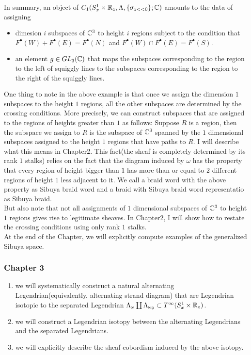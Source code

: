 In summary, an object of $C_1(S^1_x\times \mathbb{R}_z,\Lambda,\{\sigma_{z<<0}\};\mathbb{C})$ amounts to the data of assigning 
\begin{itemize}
\item  dimesion $i$ subspaces of $\mathbb{C}^3$ to height $i$ regions subject to the condition that $F^\bullet(W)+F^\bullet(E) = F^\bullet(N)$ and $F^\bullet(W)\cap F^\bullet(E) = F^\bullet(S)$.

\item an element $g \in GL_3(\mathbb{C})$ that maps the subspaces corresponding to the region to the left of squiggly lines to the subspaces corresponding to the region to the right of the squiggly lines.
\end{itemize}
One thing to note in the above example is that once we assign the dimension $1$ subspaces to the height $1$ regions, all the other subspaces are determined by the crossing conditions. More precisely, we can construct subspaces that are assigned to the regions of heights greater than $1$ as follows: Suppose $R$ is a region, then the subspace we assign to $R$ is the subspace of $\mathbb{C}^3$ spanned by the $1$ dimensional subspaces assigned to the height $1$ regions that have paths to $R$. I will describe what this means in Chapter2. This fact(the sheaf is completely determined by its rank $1$ stalks) relies on the fact that the diagram induced by $\omega$ has the property that every region of height bigger than $1$ has more than or equal to $2$ different regions of height $1$ less adjacent to it. We call a braid word with the above property as Sibuya braid word and a braid with Sibuya braid word representatio as Sibuya braid.\\
But also note that not all assignments of $1$ dimensional subspaces of $\mathbb{C}^3$ to height $1$ regions gives rise to legitimate sheaves. In Chapter2, I will show how to restate the crossing conditions using only rank $1$ stalks.\\
At the end of the Chapter, we will explicitly compute examples of the generalized Sibuya space.
\subsubsection*{Chapter 3}
\begin{enumerate}[label = (\roman*)]
\item we will systematically construct a natural alternating Legendrian(equivalently, alternating strand diagram) that are Legendrian isotopic to the separated Legendrian $\Lambda_\omega \coprod \Lambda_{\omega_\emptyset} \subset T^\infty(S^1_x \times \mathbb{R}_z)$.

\item we will construct a Legendrian isotopy between the alternating Legendrians and the separated Legendrians.

\item we will explicitly describe the sheaf cobordism induced by the above isotopy.
\end{enumerate}
